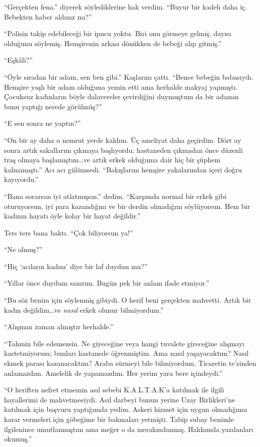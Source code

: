 ``Gerçekten fena.'' diyerek söylediklerine hak verdim. ``Buyur bir kadeh daha
iç. Bebekten haber aldınız mı?''

``Polisin takip edebileceği bir ipucu yoktu. Biri onu görmeye gelmiş, dayısı
olduğunu söylemiş. Hemşirenin arkası dönükken de bebeği alıp gitmiş.''

``Eşkâli?''

``Öyle sıradan bir adam, sen ben gibi.'' Kaşlarını çattı. ``Bence bebeğin
babasıydı. Hemşire yaşlı bir adam olduğuna yemin etti ama herhalde makyaj
yapmıştı. Çocuksuz kadınların böyle dalavereler çevirdiğini duymuştum da bir
adamın bunu yaptığı nerede görülmüş?''

``E sen sonra ne yaptın?''

``On bir ay daha o nemrut yerde kaldım. Üç ameliyat daha geçirdim. Dört ay sonra
artık sakallarım çıkmaya başlıyordu; hastaneden çıkmadan önce düzenli traş
olmaya başlamıştım\dots ve artık erkek olduğuma dair hiç bir şüphem
kalmamıştı.'' Acı acı gülümsedi. ``Bakışlarım hemşire yakalarından içeri
doğru kayıyordu.''

``Bana sorarsan iyi atlatmışsın.'' dedim. ``Karşımda normal bir erkek gibi
oturuyorsun, iyi para kazandığını ve bir derdin olmadığını söylüyorsun. Hem bir
kadının hayatı öyle kolay bir hayat değildir.''

Ters ters bana baktı. ``Çok biliyorsun ya!''

``Ne olmuş?''

``Hiç `acıların kadını' diye bir laf duydun mu?''

``Yıllar önce duydum sanırım. Bugün pek bir anlam ifade etmiyor.''

``Bu söz benim için söylenmiş gibiydi. O herif beni gerçekten mahvetti.
Artık bir kadın değildim\dots ve \emph{nasıl} erkek olunur bilmiyordum.''

``Alışman zaman almıştır herhalde.''

``Tahmin bile edemezsin. Ne giyeceğine veya hangi tuvalete gireceğine alışmayı
kastetmiyorum; bunları hastanede öğrenmiştim. Ama nasıl yaşayacaktım? Nasıl
ekmek parası kazanacaktım? Araba sürmeyi bile bilmiyordum. Ticaretin te'sinden
anlamazdım. Amelelik de yapamazdım. Her yerim yara bere içindeydi.''

``O heriften nefret etmemin asıl sebebi K.A.L.T.A.K'a katılmak ile ilgili
hayallerimi de mahvetmesiydi. Asıl darbeyi bunun yerine Uzay Birlikleri'ne
katılmak için başvuru yaptığımda yedim. Askeri hizmet için uygun olmadığıma
karar vermeleri için göbeğime bir bakmaları yetmişti. Tabip subay benimle
ilgilenince umutlanmıştım ama meğer o da merakındanmış. Hakkımda yazılanları
okumuş.''

